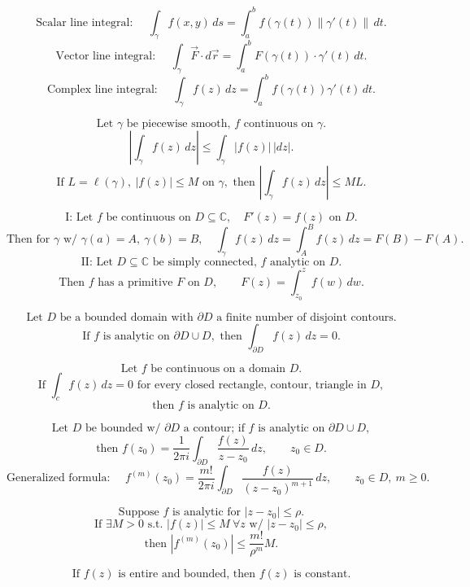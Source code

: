 \documentclass[11pt]{article}
\begin{document}
\newpage


\[
\text{Scalar line integral: }\quad
\int_\gamma f(x,y)\,ds
=
\int_a^b f(\gamma(t))\|\gamma'(t)\|\,dt.
\]
\[
\text{Vector line integral: }\quad
\int_\gamma \vec F\cdot d\vec r
=
\int_a^b F(\gamma(t))\cdot \gamma'(t)\,dt.
\]
\[
\text{Complex line integral: }\quad
\int_\gamma f(z)\,dz
=
\int_a^b f(\gamma(t))\gamma'(t)\,dt.
\]

\[
\text{Let }\gamma\text{ be piecewise smooth, }f\text{ continuous on }\gamma.
\]
\[
\left|\int_\gamma f(z)\,dz\right|
\le
\int_\gamma |f(z)|\,|dz|.
\]
\[
\text{If }L=\ell(\gamma),\ |f(z)|\le M\text{ on }\gamma,\text{ then }
\left|\int_\gamma f(z)\,dz\right|\le ML.
\]

\[
\text{I: Let }f\text{ be continuous on }D\subseteq\mathbb C,\quad F'(z)=f(z)\text{ on }D.
\]
\[
\text{Then for }\gamma\text{ w/ }\gamma(a)=A,\ \gamma(b)=B,\quad
\int_\gamma f(z)\,dz=\int_A^B f(z)\,dz=F(B)-F(A).
\]
\[
\text{II: Let }D\subseteq\mathbb C\text{ be simply connected, }f\text{ analytic on }D.
\]
\[
\text{Then }f\text{ has a primitive }F\text{ on }D,\qquad
F(z)=\int_{z_0}^z f(w)\,dw.
\]

\[
\text{Let }D\text{ be a bounded domain with }\partial D
\text{ a finite number of disjoint contours.}
\]
\[
\text{If }f\text{ is analytic on }\partial D\cup D,\text{ then }
\int_{\partial D} f(z)\,dz=0.
\]

\[
\text{Let }f\text{ be continuous on a domain }D.
\]
\[
\text{If }\int_c f(z)\,dz=0\text{ for every closed rectangle, contour, triangle in }D,
\]
\[
\text{then }f\text{ is analytic on }D.
\]

\[
\text{Let }D\text{ be bounded w/ }\partial D\text{ a contour; if }f
\text{ is analytic on }\partial D\cup D,
\]
\[
\text{then } f(z_0)=\frac{1}{2\pi i}\int_{\partial D}\frac{f(z)}{z-z_0}\,dz,
\qquad z_0\in D.
\]
\[
\text{Generalized formula: }\quad
f^{(m)}(z_0)=\frac{m!}{2\pi i}\int_{\partial D}
\frac{f(z)}{(z-z_0)^{m+1}}\,dz,\qquad z_0\in D,\ m\ge0.
\]

\[
\text{Suppose }f\text{ is analytic for }|z-z_0|\le \rho.
\]
\[
\text{If }\exists M>0\text{ s.t. }|f(z)|\le M\ \forall z
\text{ w/ }|z-z_0|\le\rho,
\]
\[
\text{then }\left|f^{(m)}(z_0)\right|\le \frac{m!}{\rho^m}M.
\]

\[
\text{If }f(z)\text{ is entire and bounded, then }f(z)\text{ is constant.}
\]
\end{document}
